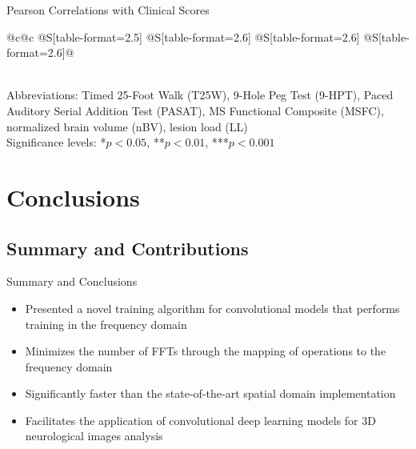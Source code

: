 \documentclass{beamer}
\begin{document}
\begin{frame}{Pearson Correlations with Clinical Scores}
\begin{tabular}{@{}c@{\hspace{\tabspace}}c%
@{\hspace{\tabspace}}S[table-format=2.5]%
@{\hspace{\tabspace}}S[table-format=2.6]
@{\hspace{\tabspace}}S[table-format=2.6]
@{\hspace{\tabspace}}S[table-format=2.6]@{}}
 \bottomrule
\end{tabular}
\\[0.66em]
Abbreviations: Timed 25-Foot Walk (T25W), 9-Hole Peg Test (9-HPT), Paced
Auditory Serial Addition Test (PASAT), MS Functional Composite (MSFC), normalized brain volume
(nBV), lesion load (LL)\\[0.33em]
Significance levels: *$p < 0.05$, **$p < 0.01$, ***$p<0.001$
\end{frame}


\section{Conclusions}

\subsection*{Summary and Contributions}

\begin{frame}{Summary and Conclusions} %
\begin{itemize}
\item Presented a novel training algorithm for convolutional models that
performs training in the frequency domain
\item Minimizes the number of FFTs through the mapping of operations to
the frequency domain
\item Significantly faster than the state-of-the-art spatial domain
implementation
\item Facilitates the application of convolutional deep learning models for 3D
neurological images analysis
\end{itemize}
\end{frame}
\end{document}
